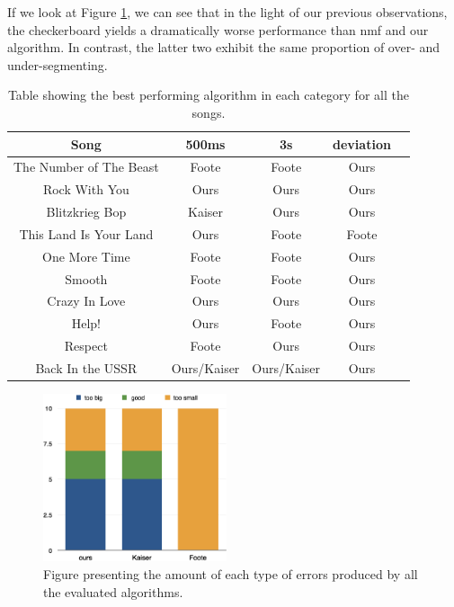If we look at Figure \ref{fig:boundcount}, we can see that in the light of our previous observations, the checkerboard yields a dramatically worse performance than nmf and our algorithm. In contrast, the latter two exhibit the same proportion of over- and under-segmenting.


\begin{table}
\begin{center}
\begin{tabular}{| c | c | c | c | c | } \hline 
Song  								& 	500ms 			&  3s						&  deviation	\\ \hline \hline
The Number of The Beast 	&	Foote			& 	Foote  				&  Ours 			\\ \hline
Rock With You					&	Ours				&  Ours			  		&  Ours			\\ \hline
Blitzkrieg Bop 					&	Kaiser			&  Ours  				&  Ours 			\\ \hline
This Land Is Your Land 		&	Ours				&  Foote			  	&  Foote 		\\ \hline
One More Time					&	Foote			&  Foote    				&  Ours 			\\ \hline
Smooth								&	Foote			&  Foote  				&  Ours 			\\ \hline
Crazy In Love					&	Ours				&  Ours  				&  Ours  		\\ \hline
Help!									&	Ours				&  Foote		   		&  Ours 			\\ \hline
Respect								&	Foote			&  Ours  				&  Ours 			\\ \hline
Back In the USSR				&	Ours/Kaiser	&  Ours/Kaiser 		&  Ours		    	\\ \hline

\end{tabular}
\caption{Table showing the best performing algorithm in each category for all the songs.}
\label{table:evalStructureRank}
\end{center}
\end{table}


\begin{figure}
\vspace{-10pt}
  \begin{center}
    \includegraphics[width=0.48\textwidth]{Figures/count}
  \end{center}
  \caption{Figure presenting the amount of each type of errors produced by all the evaluated algorithms.}
\label{fig:boundcount}
\end{figure}

